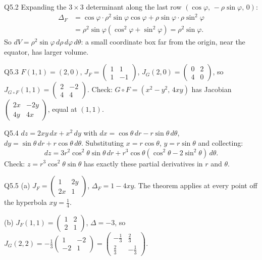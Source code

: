 \begin{solution}{Q5.2}
Expanding the $3\times3$ determinant along the last row $(\cos\varphi,\,-\rho\sin\varphi,\,0)$:
\begin{align*} \Delta_F&=\cos\varphi\cdot\rho^2\sin\varphi\cos\varphi+\rho\sin\varphi\cdot\rho\sin^2\varphi\\ &=\rho^2\sin\varphi(\cos^2\varphi+\sin^2\varphi)=\rho^2\sin\varphi . \end{align*}
So $dV=\rho^2\sin\varphi\,d\rho\,d\varphi\,d\theta$: a small coordinate box far from the origin, near the
equator, has larger volume.
\end{solution}

\begin{solution}{Q5.3}
$F(1,1)=(2,0)$, $J_F=\begin{pmatrix}1&1\\1&-1\end{pmatrix}$, $J_G(2,0)=\begin{pmatrix}0&2\\4&0\end{pmatrix}$, so
$J_{G\circ F}(1,1)=\begin{pmatrix}2&-2\\4&4\end{pmatrix}$. Check: $G\circ F=(x^2-y^2,\,4xy)$ has Jacobian
$\begin{pmatrix}2x&-2y\\4y&4x\end{pmatrix}$, equal at $(1,1)$.
\end{solution}

\begin{solution}{Q5.4}
$dz=2xy\,dx+x^2\,dy$ with $dx=\cos\theta\,dr-r\sin\theta\,d\theta$, $dy=\sin\theta\,dr+r\cos\theta\,d\theta$. Substituting
$x=r\cos\theta$, $y=r\sin\theta$ and collecting:
\[ dz=3r^2\cos^2\theta\sin\theta\,dr+r^3\cos\theta(\cos^2\theta-2\sin^2\theta)\,d\theta . \]
Check: $z=r^3\cos^2\theta\sin\theta$ has exactly these partial derivatives in $r$ and $\theta$.
\end{solution}

\begin{solution}{Q5.5}
(a) $J_F=\begin{pmatrix}1&2y\\2x&1\end{pmatrix}$, $\Delta_F=1-4xy$. The theorem applies at every point off the
hyperbola $xy=\frac14$.

(b) $J_F(1,1)=\begin{pmatrix}1&2\\2&1\end{pmatrix}$, $\Delta=-3$, so
$J_G(2,2)=-\frac13\begin{pmatrix}1&-2\\-2&1\end{pmatrix}=\begin{pmatrix}-\frac13&\frac23\\ \frac23&-\frac13\end{pmatrix}$.
\end{solution}

